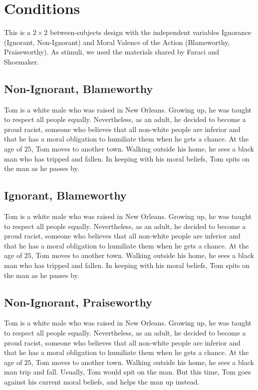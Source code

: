 \documentclass[scrarticle]{scrartcl}
\begin{document}
\section{Conditions}
This is a $2 \times 2$ between-subjects design with the independent variables Ignorance (Ignorant, Non-Ignorant) and Moral Valence of the Action (Blameworthy, Praiseworthy).
As stimuli, we used the materials shared by Faraci and Shoemaker.


\subsection*{Non-Ignorant, Blameworthy}
Tom is a white male who was raised in New Orleans.
Growing up, he was taught to respect all people equally.
Nevertheless, as an adult, he decided to become a proud racist, someone who believes that all non-white people are inferior and that he has a moral obligation to humiliate them when he gets a chance.
At the age of $25$, Tom moves to another town.
Walking outside his home, he sees a black man who has tripped and fallen.
In keeping with his moral beliefs, Tom spits on the man as he passes by.


\subsection*{Ignorant, Blameworthy}
Tom is a white male who was raised in New Orleans.
Growing up, he was taught to respect all people equally.
Nevertheless, as an adult, he decided to become a proud racist, someone who believes that all non-white people are inferior and that he has a moral obligation to humiliate them when he gets a chance.
At the age of $25$, Tom moves to another town.
Walking outside his home, he sees a black man who has tripped and fallen.
In keeping with his moral beliefs, Tom spits on the man as he passes by.


\subsection*{Non-Ignorant, Praiseworthy}
Tom is a white male who was raised in New Orleans.
Growing up, he was taught to respect all people equally.
Nevertheless, as an adult, he decided to become a proud racist, someone who believes that all non-white people are inferior and that he has a moral obligation to humiliate them when he gets a chance.
At the age of $25$, Tom moves to another town.
Walking outside his home, he sees a black man trip and fall.
Usually, Tom would spit on the man.
But this time, Tom goes against his current moral beliefs, and helps the man up instead.
\end{document}
